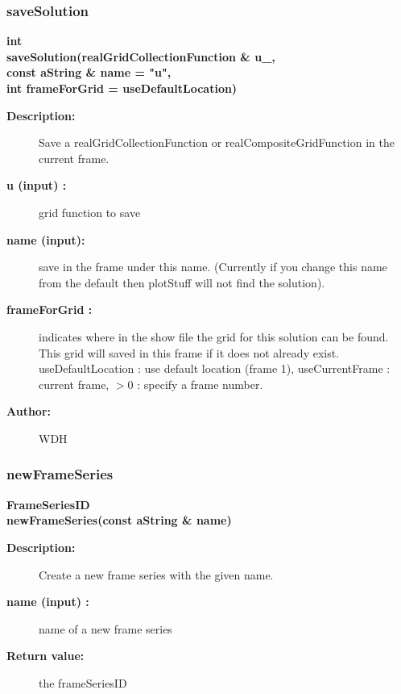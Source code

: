 \subsubsection{saveSolution}
 
\begin{flushleft} \textbf{%
int  \\ 
\settowidth{\OgshowIncludeArgIndent}{saveSolution(}%
saveSolution(realGridCollectionFunction \& u\_, \\ 
\hspace{\OgshowIncludeArgIndent}const aString \& name  = "u",\\ 
\hspace{\OgshowIncludeArgIndent}int frameForGrid  = useDefaultLocation)
}\end{flushleft}
\begin{description}
\item[{\bf Description:}] 
   Save a realGridCollectionFunction or realCompositeGridFunction in the current frame.
\item[{\bf u (input) :}]  grid function to save
\item[{\bf name (input):}]  save in the frame under this name. (Currently if you change this name
   from the default then plotStuff will not find the solution).
\item[{\bf frameForGrid :}]  indicates where in the show file the grid for this solution can be found.
    This grid will saved in this frame if it does not already exist.
     useDefaultLocation : use default location (frame 1), useCurrentFrame : current frame, 
      $>0$ : specify a frame number. 
\item[{\bf Author:}]  WDH
\end{description}
\subsubsection{newFrameSeries}
 
\begin{flushleft} \textbf{%
FrameSeriesID  \\ 
\settowidth{\OgshowIncludeArgIndent}{newFrameSeries(}%
newFrameSeries(const aString \& name)
}\end{flushleft}
\begin{description}
\item[{\bf Description:}] 
     Create a new frame series with the given name.
 
\item[{\bf name (input) :}]  name of a new frame series
 
\item[{\bf Return value:}]  the frameSeriesID
\end{description}
